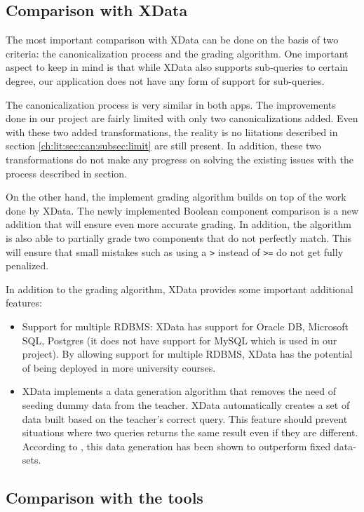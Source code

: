 \subsection{Comparison with XData}

The most important comparison with XData can be done on the basis of two criteria: the canonicalization process and the grading algorithm. One important aspect to keep in mind is that while XData also supports sub-queries to certain degree, our application does not have any form of support for sub-queries.

The canonicalization process is very similar in both apps. The improvements done in our project are fairly limited with only two canonicalizations added. Even with these two added transformations, the reality is no liitations described in section \ref{ch:lit:sec:can:subsec:limit} are still present. In addition, these two transformations do not make any progress on solving the existing issues with the process described in section.

On the other hand, the implement grading algorithm builds on top of the work done by XData. The newly implemented Boolean component comparison is a new addition that will ensure even more accurate grading. In addition, the algorithm is also able to partially grade two components that do not perfectly match. This will ensure that small mistakes such as using a \texttt{>} instead of \texttt{>=} do not get fully penalized.

In addition to the grading algorithm, XData provides some important additional features:
\begin{itemize}
    \item Support for multiple RDBMS: XData has support for Oracle DB, Microsoft SQL, Postgres (it does not have support for MySQL which is used in our project). By allowing support for multiple RDBMS, XData has the potential of being deployed in more university courses.
    \item XData implements a data generation algorithm that removes the need of seeding dummy data from the teacher. XData automatically creates a set of data built based on the teacher's correct query. This feature should prevent situations where two queries returns the same result even if they are different. According to \cite{lit:xdata_d}, this data generation has been shown to outperform fixed data-sets.
\end{itemize}

\subsection{Comparison with the tools}

